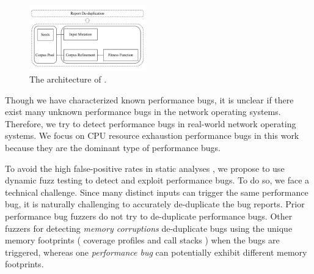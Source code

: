 \section{\sys}
\label{s:method}
\begin{figure}[t]
    \centering
    \includegraphics[width=0.45\textwidth]{fig/netfuzz.pdf}
    \caption{The architecture of \sys.
    }
    \label{fig:arch}
\end{figure}

Though we have characterized known performance bugs, %
%
it is unclear if there exist many unknown performance bugs in the network operating systems.
%
Therefore, we try to detect performance bugs in real-world network operating systems.
%
We focus on CPU resource exhaustion performance bugs in this work because they are the dominant type of performance bugs.
%
%

To avoid the high false-positive rates in static analyses \cite{nistor2013toddler,nistor2015caramel},
%
we propose to use dynamic fuzz testing to detect and exploit performance bugs.
%
%
%
%
To do so, we face a technical challenge.
%
Since many distinct inputs can trigger the same performance bug, it is naturally challenging to accurately de-duplicate the bug reports.
%
Prior performance bug fuzzers \cite{slowfuzz, hotfuzz} do not try to de-duplicate performance bugs.
%
Other fuzzers for detecting \emph{memory corruptions} de-duplicate bugs using the unique memory footprints (\eg{,} coverage profiles and call stacks \cite{klees2018evaluating}) when the bugs are triggered,
%
whereas one \emph{performance bug} can potentially exhibit different memory footprints.
%
%

